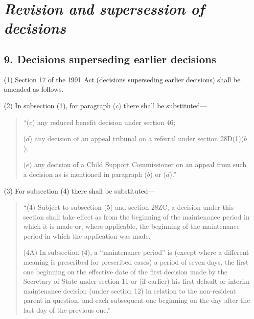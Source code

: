 \documentclass[12pt,a4paper]{article}
\begin{document}
\section{\itshape Revision and supersession of decisions}


%
%
%
%
%
%
%
%
%
%
\subsection{9. Decisions superseding earlier decisions}

(1) Section 17 of the 1991 Act (decisions superseding earlier decisions) shall be amended as follows.

(2) In subsection (1), for paragraph ($c$)  there shall be substituted—
\begin{quotation}
“($c$) any reduced benefit decision under section 46;

($d$) any decision of an appeal tribunal on a referral under section 28D(1)($b$);

($e$) any decision of a Child Support Commissioner on an appeal from such a decision as is mentioned in paragraph ($b$)  or ($d$).”
\end{quotation}

(3) For subsection (4)  there shall be substituted—
\begin{quotation}
“(4) Subject to subsection (5)  and section 28ZC, a decision under this section shall take effect as from the beginning of the maintenance period in which it is made or, where applicable, the beginning of the maintenance period in which the application was made.

(4A) In subsection (4), a “maintenance period” is (except where a different meaning is prescribed for prescribed cases) a period of seven days, the first one beginning on the effective date of the first decision made by the Secretary of State under section 11 or (if earlier) his first default or interim maintenance decision (under section 12) in relation to the non-resident parent in question, and each subsequent one beginning on the day after the last day of the previous one.”
\end{quotation}
\end{document}
